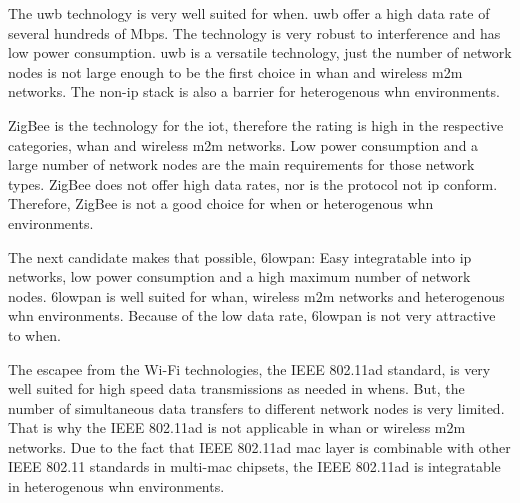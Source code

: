 The \gls{uwb} technology is very well suited for \gls{when}. \gls{uwb} offer a high data rate of several hundreds of Mbps. The technology is very robust to interference and has low power consumption. \gls{uwb} is a versatile technology, just the number of network nodes is not large enough to be the first choice in \gls{whan} and wireless \gls{m2m} networks. The non-\gls{ip} stack is also a barrier for heterogenous \gls{whn} environments.

ZigBee is the technology for the \gls{iot}, therefore the rating is high in the respective categories, \gls{whan} and wireless \gls{m2m} networks. Low power consumption and a large number of network nodes are the main requirements for those network types. ZigBee does not offer high data rates, nor is the protocol not \gls{ip} conform. Therefore, ZigBee is not a good choice for \gls{when} or heterogenous \gls{whn} environments.

The next candidate makes that possible, \gls{6lowpan}: Easy integratable into \gls{ip} networks, low power consumption and a high maximum number of network nodes. \gls{6lowpan} is well suited for \gls{whan}, wireless \gls{m2m} networks and heterogenous \gls{whn} environments. Because of the low data rate, \gls{6lowpan} is not very attractive to \gls{when}.

The escapee from the Wi-Fi technologies, the IEEE 802.11ad standard, is very well suited for high speed data transmissions as needed in \glspl{when}. But, the number of simultaneous data transfers to different network nodes is very limited. That is why the IEEE 802.11ad is not applicable in \gls{whan} or wireless \gls{m2m} networks. Due to the fact that IEEE 802.11ad \gls{mac} layer is combinable with other IEEE 802.11 standards in multi-\gls{mac} chipsets, the IEEE 802.11ad is integratable in heterogenous \gls{whn} environments.
